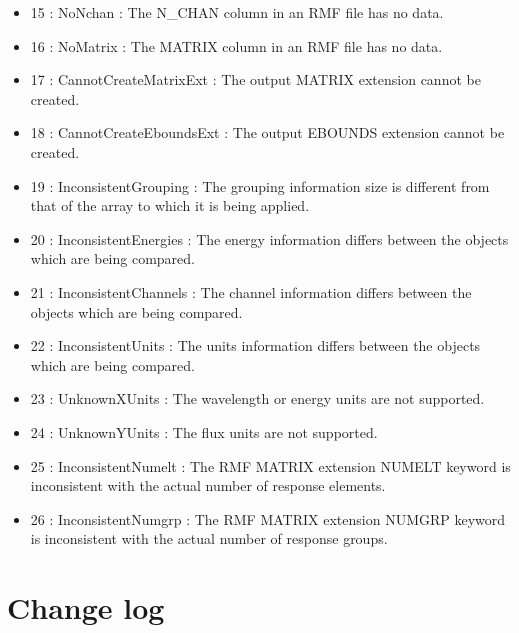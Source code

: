 \documentclass[11pt]{book}
\begin{document}
\begin{itemize}
\item 15 : NoNchan : The N\_CHAN column in an RMF file has no data.

\item 16 : NoMatrix : The MATRIX column in an RMF file has no data.

\item 17 : CannotCreateMatrixExt : The output MATRIX extension cannot be created.

\item 18 : CannotCreateEboundsExt : The output EBOUNDS extension cannot be created.

\item 19 : InconsistentGrouping : The grouping information size is
different from that of the array to which it is being applied.

\item 20 : InconsistentEnergies : The energy information differs
between the objects which are being compared.

\item 21 : InconsistentChannels : The channel information differs
between the objects which are being compared.

\item 22 : InconsistentUnits : The units information differs
between the objects which are being compared.

\item 23 : UnknownXUnits : The wavelength or energy units are not
  supported.

\item 24 : UnknownYUnits : The flux units are not supported.

\item 25 : InconsistentNumelt : The RMF MATRIX extension NUMELT
  keyword is inconsistent with the actual number of response elements.

\item 26 : InconsistentNumgrp : The RMF MATRIX extension NUMGRP
  keyword is inconsistent with the actual number of response groups.

\end{itemize}


\chapter{Change log}
\end{document}
